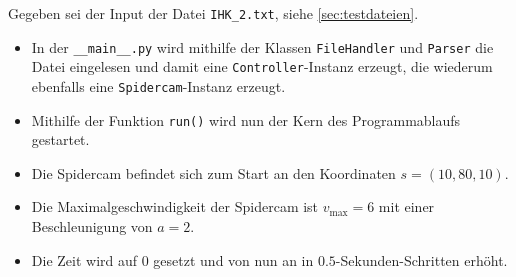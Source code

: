 Gegeben sei der Input der Datei \texttt{IHK\_2.txt}, siehe \ref{sec:testdateien}.

\begin{itemize}
    \item In der \texttt{\_\_main\_\_.py} wird mithilfe der Klassen \texttt{FileHandler} und \texttt{Parser} die Datei eingelesen und damit eine \texttt{Controller}-Instanz erzeugt, die wiederum ebenfalls eine \texttt{Spidercam}-Instanz erzeugt.
    \item Mithilfe der Funktion \texttt{run()} wird nun der Kern des Programmablaufs gestartet.
    \item Die Spidercam befindet sich zum Start an den Koordinaten $s = (10, 80, 10)$.
    \item Die Maximalgeschwindigkeit der Spidercam ist $v_{\max} = 6$ mit einer Beschleunigung von $a = 2$.
    \item Die Zeit wird auf $0$ gesetzt und von nun an in $0.5$-Sekunden-Schritten erhöht.


\end{itemize}

